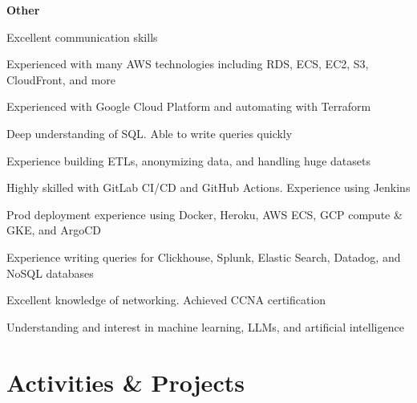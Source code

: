 \documentclass[margin,line]{resume}
\begin{document}
\begin{resume}
    \hspace{2.4mm}\textbf{Other}\vspace{1mm}
    \begin{list2}
        \item Excellent communication skills
        \item Experienced with many AWS technologies including RDS, ECS, EC2, S3, CloudFront, and more
        \item Experienced with Google Cloud Platform and automating with Terraform
        \item Deep understanding of SQL. Able to write queries quickly
        \item Experience building ETLs, anonymizing data, and handling huge datasets
        \item Highly skilled with GitLab CI/CD and GitHub Actions. Experience using Jenkins
        \item Prod deployment experience using Docker, Heroku, AWS ECS, GCP compute \& GKE, and ArgoCD
        \item Experience writing queries for Clickhouse, Splunk, Elastic Search, Datadog, and NoSQL databases
        \item Excellent knowledge of networking. Achieved CCNA certification
        \item Understanding and interest in machine learning, LLMs, and artificial intelligence
    \end{list2}\vspace{-1.5mm}

\sectionline

    \section{\mysidestyle \textbf{\large{A}\small{ctivities \& Projects}}}


\end{resume}
\end{document}
